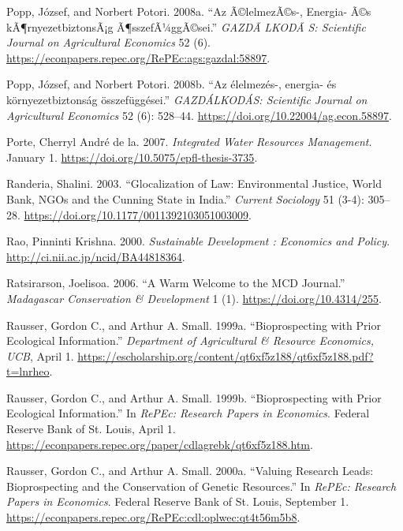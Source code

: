 \begin{CSLReferences}{1}{1}
Popp, József, and Norbert Potori. 2008a. {``Az Ã©lelmezÃ©s-, Energia-
Ã©s kÃ¶rnyezetbiztonsÃ¡g Ã¶sszefÃ¼ggÃ©sei.''} \emph{GAZDÃ LKODÃ S:
Scientific Journal on Agricultural Economics} 52 (6).
\url{https://econpapers.repec.org/RePEc:ags:gazdal:58897}.

Popp, József, and Norbert Potori. 2008b. {``Az élelmezés-, energia- és
környezetbiztonság összefüggései.''} \emph{GAZDÁLKODÁS: Scientific
Journal on Agricultural Economics} 52 (6): 528--44.
\url{https://doi.org/10.22004/ag.econ.58897}.

Porte, Cherryl André de la. 2007. \emph{Integrated Water Resources
Management}. January 1. \url{https://doi.org/10.5075/epfl-thesis-3735}.

Randeria, Shalini. 2003. {``Glocalization of Law: Environmental Justice,
World Bank, NGOs and the Cunning State in India.''} \emph{Current
Sociology} 51 (3-4): 305--28.
\url{https://doi.org/10.1177/0011392103051003009}.

Rao, Pinninti Krishna. 2000. \emph{Sustainable Development : Economics
and Policy}. \url{http://ci.nii.ac.jp/ncid/BA44818364}.

Ratsirarson, Joelisoa. 2006. {``A Warm Welcome to the MCD Journal.''}
\emph{Madagascar Conservation \& Development} 1 (1).
\url{https://doi.org/10.4314/255}.

Rausser, Gordon C., and Arthur A. Small. 1999a. {``Bioprospecting with
Prior Ecological Information.''} \emph{Department of Agricultural \&
Resource Economics, UCB}, April 1.
\url{https://escholarship.org/content/qt6xf5z188/qt6xf5z188.pdf?t=lnrheo}.

Rausser, Gordon C., and Arthur A. Small. 1999b. {``Bioprospecting with
Prior Ecological Information.''} In \emph{RePEc: Research Papers in
Economics}. Federal Reserve Bank of St. Louis, April 1.
\url{https://econpapers.repec.org/paper/cdlagrebk/qt6xf5z188.htm}.

Rausser, Gordon C., and Arthur A. Small. 2000a. {``Valuing Research
Leads: Bioprospecting and the Conservation of Genetic Resources.''} In
\emph{RePEc: Research Papers in Economics}. Federal Reserve Bank of St.
Louis, September 1.
\url{https://econpapers.repec.org/RePEc:cdl:oplwec:qt4t56m5b8}.


\end{CSLReferences}
